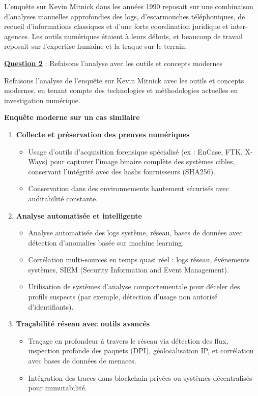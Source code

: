 \documentclass[12pt, a4paper]{article}
\newcommand{\question}[1]{\textbf{\underline{Question #1}}}
\begin{document}
\begin{enumerate}[label=\textbf{\arabic*.}, start=6]
		L'enquête sur Kevin Mitnick dans les années 1990 reposait sur une combinaison d'analyses manuelles approfondies des logs, d'escarmouches téléphoniques, de recueil d'informations classiques et d'une forte coordination juridique et inter-agences. Les outils numériques étaient à leurs débuts, et beaucoup de travail reposait sur l'expertise humaine et la traque sur le terrain.
		
		\question{2} : Refaisons l'analyse avec les outils et concepts modernes
		
		Refaisons l'analyse de l'enquête sur Kevin Mitnick avec les outils et concepts modernes, en tenant compte des technologies et méthodologies actuelles en investigation numérique.
		
		\textbf{Enquête moderne sur un cas similaire}
		
		\begin{enumerate}
			\item \textbf{Collecte et préservation des preuves numériques}
			\begin{itemize}
				\item Usage d'outils d'acquisition forensique spécialisé (ex : EnCase, FTK, X-Ways) pour capturer l'image binaire complète des systèmes cibles, conservant l'intégrité avec des hashs fournisseurs (SHA256).
				\item Conservation dans des environnements hautement sécurisés avec auditabilité constante.
			\end{itemize}
			
			\item \textbf{Analyse automatisée et intelligente}
			\begin{itemize}
				\item Analyse automatisée des logs système, réseau, bases de données avec détection d'anomalies basée sur machine learning.
				\item Corrélation multi-sources en temps quasi réel : logs réseau, événements systèmes, SIEM (Security Information and Event Management).
				\item Utilisation de systèmes d'analyse comportementale pour déceler des profils suspects (par exemple, détection d'usage non autorisé d'identifiants).
			\end{itemize}
			
			\item \textbf{Traçabilité réseau avec outils avancés}
			\begin{itemize}
				\item Traçage en profondeur à travers le réseau via détection des flux, inspection profonde des paquets (DPI), géolocalisation IP, et corrélation avec bases de données de menaces.
				\item Intégration des traces dans blockchain privées ou systèmes décentralisés pour immutabilité.
			\end{itemize}
			

\end{enumerate}
\end{enumerate}
\end{document}
